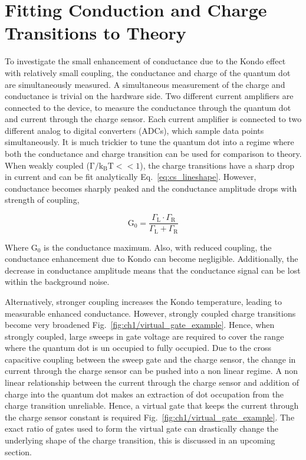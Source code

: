 \section{Fitting Conduction and Charge Transitions to Theory}
To investigate the small enhancement of conductance due to the Kondo effect with relatively small coupling, the conductance and charge of the quantum dot are simultaneously measured. A simultaneous measurement of the charge and conductance is trivial on the hardware side. Two different current amplifiers are connected to the device, to measure the conductance through the quantum dot and current through the charge sensor. Each current amplifier is connected to two different analog to digital converters (ADCs), which sample data points simultaneously. It is much trickier to tune the quantum dot into a regime where both the conductance and charge transition can be used for comparison to theory. When weakly coupled ($\mathrm{\Gamma/k_BT}<<1$), the charge transitions have a sharp drop in current and can be fit analytically Eq.~\ref{eq:cs_lineshape}. However, conductance becomes sharply peaked and the conductance amplitude drops with strength of coupling, 

\begin{equation}\label{eq:cond_amp}
 \mathrm{G_0} = 
 \frac
 {\Gamma_\mathrm{L}\cdot\Gamma_\mathrm{R}}
 {\Gamma_\mathrm{L} + \Gamma_\mathrm{R}}
\end{equation}

Where $\mathrm{G_0}$ is the conductance maximum. Also, with reduced coupling, the conductance enhancement due to Kondo can become negligible. Additionally, the decrease in conductance amplitude means that the conductance signal can be lost within the background noise.


Alternatively, stronger coupling increases the Kondo temperature, leading to measurable enhanced conductance. However, strongly coupled charge transitions become very broadened Fig.~\ref{fig:ch1/virtual_gate_example}. Hence, when strongly coupled, large sweeps in gate voltage are required to cover the range where the quantum dot is un occupied to fully occupied. Due to the cross capacitive coupling between the sweep gate and the charge sensor, the change in current through the charge sensor can be pushed into a non linear regime. A non linear relationship between the current through the charge sensor and addition of charge into the quantum dot makes an extraction of dot occupation from the charge transition unreliable. Hence, a virtual gate that keeps the current through the charge sensor constant is required Fig.~\ref{fig:ch1/virtual_gate_example}. The exact ratio of gates used to form the virtual gate can drastically change the underlying shape of the charge transition, this is discussed in an upcoming section. 


